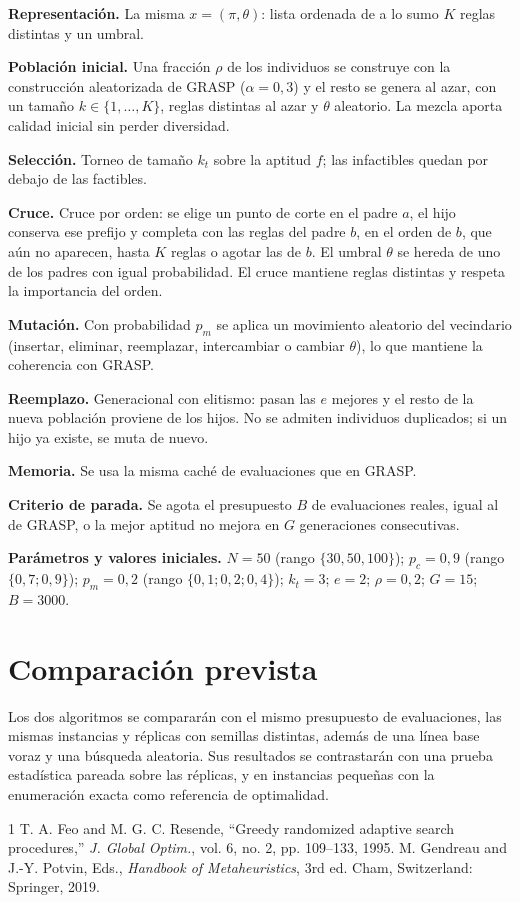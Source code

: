 \documentclass[conference]{IEEEtran}
\begin{document}
	\textbf{Representaci\'on.} La misma $x=(\pi,\theta)$: lista ordenada de a lo sumo $K$ reglas distintas y un umbral.
	
	\textbf{Poblaci\'on inicial.} Una fracci\'on $\rho$ de los individuos se construye con la construcci\'on aleatorizada de GRASP ($\alpha=0{,}3$) y el resto se genera al azar, con un tama\~no $k\in\{1,\dots,K\}$, reglas distintas al azar y $\theta$ aleatorio. La mezcla aporta calidad inicial sin perder diversidad.
	
	\textbf{Selecci\'on.} Torneo de tama\~no $k_t$ sobre la aptitud $f$; las infactibles quedan por debajo de las factibles.
	
	\textbf{Cruce.} Cruce por orden: se elige un punto de corte en el padre $a$, el hijo conserva ese prefijo y completa con las reglas del padre $b$, en el orden de $b$, que a\'un no aparecen, hasta $K$ reglas o agotar las de $b$. El umbral $\theta$ se hereda de uno de los padres con igual probabilidad. El cruce mantiene reglas distintas y respeta la importancia del orden.
	
	\textbf{Mutaci\'on.} Con probabilidad $p_m$ se aplica un movimiento aleatorio del vecindario (insertar, eliminar, reemplazar, intercambiar o cambiar $\theta$), lo que mantiene la coherencia con GRASP.
	
	\textbf{Reemplazo.} Generacional con elitismo: pasan las $e$ mejores y el resto de la nueva poblaci\'on proviene de los hijos. No se admiten individuos duplicados; si un hijo ya existe, se muta de nuevo.
	
	\textbf{Memoria.} Se usa la misma cach\'e de evaluaciones que en GRASP.
	
	\textbf{Criterio de parada.} Se agota el presupuesto $B$ de evaluaciones reales, igual al de GRASP, o la mejor aptitud no mejora en $G$ generaciones consecutivas.
	
	\textbf{Par\'ametros y valores iniciales.} $N=50$ (rango $\{30,50,100\}$); $p_c=0{,}9$ (rango $\{0{,}7;0{,}9\}$); $p_m=0{,}2$ (rango $\{0{,}1;0{,}2;0{,}4\}$); $k_t=3$; $e=2$; $\rho=0{,}2$; $G=15$; $B=3000$.
	
	\section{Comparaci\'on prevista}
	Los dos algoritmos se comparar\'an con el mismo presupuesto de evaluaciones, las mismas instancias y r\'eplicas con semillas distintas, adem\'as de una l\'inea base voraz y una b\'usqueda aleatoria. Sus resultados se contrastar\'an con una prueba estad\'istica pareada sobre las r\'eplicas, y en instancias peque\~nas con la enumeraci\'on exacta como referencia de optimalidad.
	
	\begin{thebibliography}{1}
		 T. A. Feo and M. G. C. Resende, ``Greedy randomized adaptive search procedures,'' \emph{J. Global Optim.}, vol. 6, no. 2, pp. 109--133, 1995.
		 M. Gendreau and J.-Y. Potvin, Eds., \emph{Handbook of Metaheuristics}, 3rd ed. Cham, Switzerland: Springer, 2019.
	\end{thebibliography}
	
\end{document}
